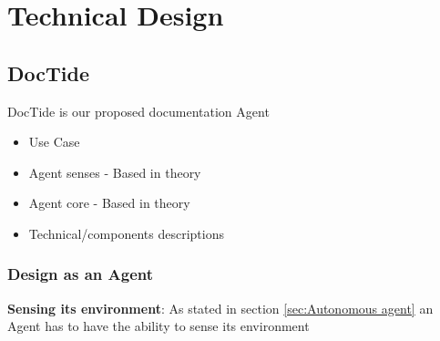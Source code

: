 \section{Technical Design}
\label{sec:design}
\subsection{DocTide}
DocTide is our proposed documentation Agent
\begin{itemize}
    \item Use Case
    \item Agent senses - Based in theory
    \item Agent core - Based in theory
    \item Technical/components descriptions 
\end{itemize}
\subsubsection{Design as an Agent}
\textbf{Sensing its environment}: As stated in section \ref{sec:Autonomous agent} an Agent has to have the ability to sense its environment 
